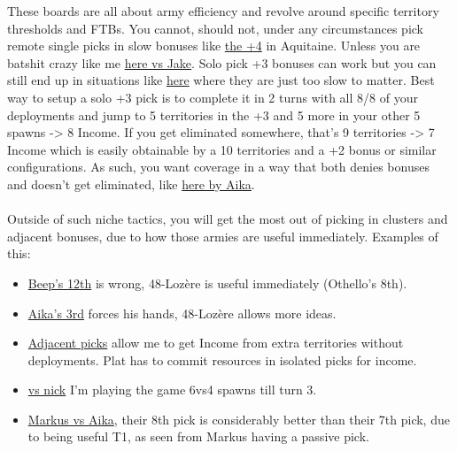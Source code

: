 These boards are all about army efficiency and revolve around specific territory thresholds and FTBs. You cannot, should not, under any circumstances pick remote single picks in slow bonuses like \href{https://www.warzone.com/MultiPlayer?GameID=37197664}{the +4} in Aquitaine. Unless you are batshit crazy like me \href{https://www.warzone.com/MultiPlayer?GameID=41429904}{here vs Jake}. Solo pick +3 bonuses can work but you can still end up in situations like \href{https://www.warzone.com/MultiPlayer?GameID=39666704}{here} where they are just too slow to matter. Best way to setup a solo +3 pick is to complete it in 2 turns with all 8/8 of your deployments and jump to 5 territories in the +3 and 5 more in your other 5 spawns -> 8 Income. If you get eliminated somewhere, that's 9 territories -> 7 Income which is easily obtainable by a 10 territories and a +2 bonus or similar configurations. As such, you want coverage in a way that both denies bonuses and doesn't get eliminated, like \href{https://www.warzone.com/MultiPlayer?GameID=41381786}{here by Aika}.
\\
\\
Outside of such niche tactics, you will get the most out of picking in clusters and adjacent bonuses, due to how those armies are useful immediately. Examples of this:
\begin{itemize}
    \item \href{https://www.warzone.com/MultiPlayer?GameID=21713173}{Beep's 12th} is wrong, 48-Lozère is useful immediately (Othello's 8th).
    \item \href{https://www.warzone.com/MultiPlayer?GameID=40224644}{Aika's 3rd} forces his hands, 48-Lozère allows more ideas.
    \item \href{https://www.warzone.com/MultiPlayer?GameID=41569033}{Adjacent picks} allow me to get Income from extra territories without deployments. Plat has to commit resources in isolated picks for income. 
    \item \href{https://www.warzone.com/MultiPlayer?GameID=41393844}{vs nick} I'm playing the game 6vs4 spawns till turn 3.
    \item \href{https://www.warzone.com/MultiPlayer?GameID=38516578}{Markus vs Aika}, their 8th pick is considerably better than their 7th pick, due to being useful T1, as seen from Markus having a passive pick.
\end{itemize}

